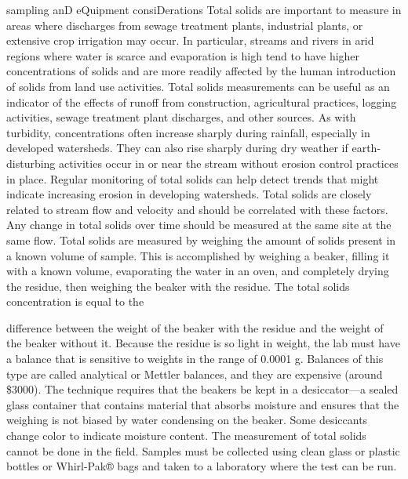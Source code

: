 \documentclass{article}
\begin{document}
sampling anD eQuipment consiDerations Total solids are important to
measure in areas where discharges from sewage treatment plants,
industrial plants, or extensive crop irrigation may occur. In
particular, streams and rivers in arid regions where water is scarce and
evaporation is high tend to have higher concentrations of solids and are
more readily affected by the human introduction of solids from land use
activities. Total solids measurements can be useful as an indicator of
the effects of runoff from construction, agricultural practices, logging
activities, sewage treatment plant discharges, and other sources. As
with turbidity, concentrations often increase sharply during rainfall,
especially in developed watersheds. They can also rise sharply during
dry weather if earth-disturbing activities occur in or near the stream
without erosion control practices in place. Regular monitoring of total
solids can help detect trends that might indicate increasing erosion in
developing watersheds. Total solids are closely related to stream flow
and velocity and should be correlated with these factors. Any change in
total solids over time should be measured at the same site at the same
flow. Total solids are measured by weighing the amount of solids present
in a known volume of sample. This is accomplished by weighing a beaker,
filling it with a known volume, evaporating the water in an oven, and
completely drying the residue, then weighing the beaker with the
residue. The total solids concentration is equal to the

difference between the weight of the beaker with the residue and the
weight of the beaker without it. Because the residue is so light in
weight, the lab must have a balance that is sensitive to weights in the
range of 0.0001 g. Balances of this type are called analytical or
Mettler balances, and they are expensive (around \$3000). The technique
requires that the beakers be kept in a desiccator---a sealed glass
container that contains material that absorbs moisture and ensures that
the weighing is not biased by water condensing on the beaker. Some
desiccants change color to indicate moisture content. The measurement of
total solids cannot be done in the field. Samples must be collected
using clean glass or plastic bottles or Whirl-Pak® bags and taken to a
laboratory where the test can be run.
\end{document}
